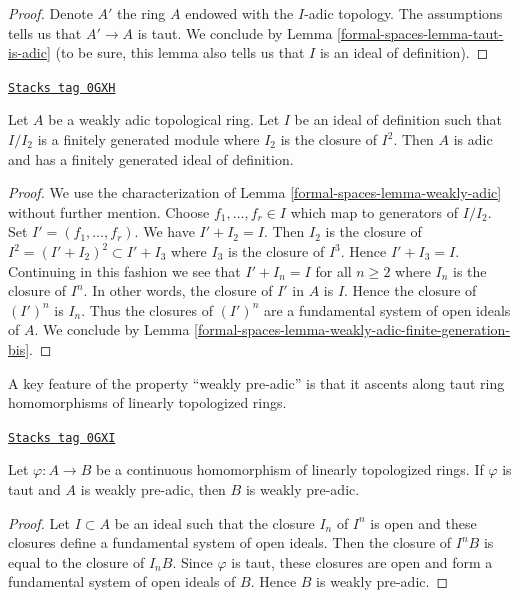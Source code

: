 \begin{proof}
Denote $A'$ the ring $A$ endowed with the $I$-adic topology.
The assumptions tells us that $A' \to A$ is taut.
We conclude by Lemma \ref{formal-spaces-lemma-taut-is-adic} (to be sure, this
lemma also tells us that $I$ is an ideal of definition).
\end{proof}

\begin{lemma}
\label{formal-spaces-lemma-weakly-adic-finite-generation}
\href{https://stacks.math.columbia.edu/tag/0GXH}{\texttt{Stacks tag 0GXH}}

Let $A$ be a weakly adic topological ring. Let $I$ be an
ideal of definition such that $I/I_2$ is a finitely generated
module where $I_2$ is the closure of $I^2$.
Then $A$ is adic and has a finitely generated ideal of definition.
\end{lemma}

\begin{proof}
We use the characterization of Lemma \ref{formal-spaces-lemma-weakly-adic}
without further mention.
Choose $f_1, \ldots, f_r \in I$ which map to generators of $I/I_2$.
Set $I' = (f_1, \ldots, f_r)$. We have $I' + I_2 = I$.
Then $I_2$ is the closure of $I^2 = (I' + I_2)^2 \subset I' + I_3$
where $I_3$ is the closure of $I^3$. Hence $I' + I_3 = I$.
Continuing in this fashion we see that $I' + I_n = I$ for all $n \geq 2$
where $I_n$ is the closure of $I^n$.
In other words, the closure of $I'$ in $A$ is $I$.
Hence the closure of $(I')^n$ is $I_n$. Thus the closures of $(I')^n$
are a fundamental system of open ideals of $A$.
We conclude by Lemma \ref{formal-spaces-lemma-weakly-adic-finite-generation-bis}.
\end{proof}

A key feature of the property ``weakly pre-adic'' is that it ascents
along taut ring homomorphisms of linearly topologized rings.

\begin{lemma}
\label{formal-spaces-lemma-taut-ascent-weakly-adic}
\href{https://stacks.math.columbia.edu/tag/0GXI}{\texttt{Stacks tag 0GXI}}

Let $\varphi : A \to B$ be a continuous homomorphism of
linearly topologized rings. If $\varphi$ is taut and $A$
is weakly pre-adic, then $B$ is weakly pre-adic.
\end{lemma}

\begin{proof}
Let $I \subset A$ be an ideal such that the closure $I_n$ of $I^n$
is open and these closures define a fundamental system of open ideals.
Then the closure of $I^nB$ is equal to the closure of $I_nB$.
Since $\varphi$ is taut, these closures are open and form a fundamental
system of open ideals of $B$. Hence $B$ is weakly pre-adic.
\end{proof}

